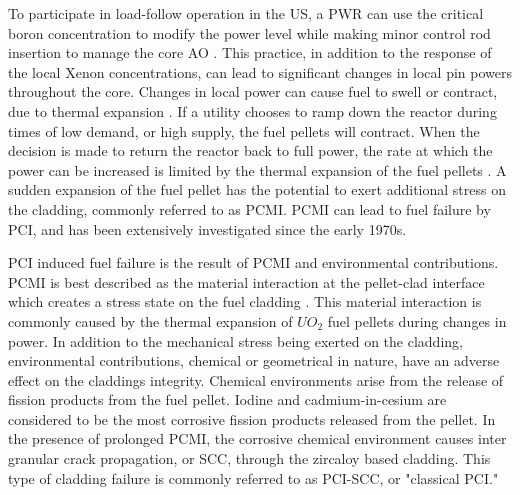 \documentclass[edeposit,fullpage]{uiucthesis2009}
\begin{document}
To participate in load-follow operation in the \gls{US}, a \gls{PWR} can use the critical boron concentration to modify the power level while making minor control rod insertion to manage the core \gls{AO} \cite{lokhov_technical_2011}.  
This practice, in addition to the response of the local Xenon concentrations, can lead to significant changes in local pin powers throughout the core.
Changes in local power can cause fuel to swell or contract, due to thermal expansion \cite{gartner_power_1984}. %
If a utility chooses to ramp down the reactor during times of low demand, or high supply, the fuel pellets will contract.
When the decision is made to return the reactor back to full power, the rate at which the power can be increased is limited by the thermal expansion of the fuel pellets \cite{gartner_power_1984}.
A sudden expansion of the fuel pellet has the potential to exert additional stress on the cladding, commonly referred to as \gls{PCMI}.
\gls{PCMI} can lead to fuel failure by \gls{PCI}, and has been extensively investigated since the early 1970s.

\gls{PCI} induced fuel failure is the result of \gls{PCMI} and environmental contributions.
\gls{PCMI} is best described as the material interaction at the pellet-clad interface which creates a stress state on the fuel cladding \cite{kennard_pci_2016}.
This material interaction is commonly caused by the thermal expansion of $UO_2$ fuel pellets during changes in power.
In addition to the mechanical stress being exerted on the cladding, environmental contributions, chemical or geometrical in nature, have an adverse effect on the claddings integrity.
Chemical environments arise from the release of fission products from the fuel pellet.
Iodine and cadmium-in-cesium are considered to be the most corrosive fission products released from the pellet. %
In the presence of prolonged \gls{PCMI}, the corrosive chemical environment causes inter granular crack propagation, or \gls{SCC}, through the zircaloy based cladding.
This type of cladding failure is commonly referred to as \gls{PCI}-\gls{SCC}, or "classical \gls{PCI}."
\end{document}
